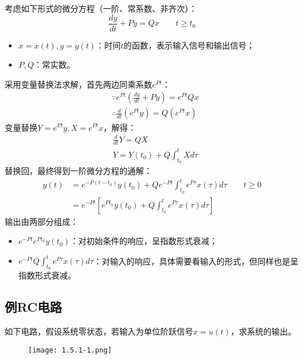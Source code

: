 考虑如下形式的微分方程（一阶、常系数、非齐次）：
\[
\frac{dy}{dt}+Py=Qx \qquad t\geqslant t_0
\]
\begin{itemize}
    \item $x=x\left( t \right) ,y=y\left( t \right) $：时间$t$的函数，表示输入信号和输出信号；
    \item $P,Q$：常实数。
\end{itemize}

采用变量替换法求解，首先两边同乘系数$e^{Pt}$：
\begin{align*}
&\because e^{Pt}\left( \frac{dy}{dt}+Py \right) =e^{Pt}Qx \\
&\therefore \frac{d}{dt}\left( e^{Pt}y \right) =Q\left( e^{Pt}x \right)
\end{align*}
变量替换$Y=e^{Pt}y,X=e^{Pt}x$，解得：
\begin{align*}
&\frac{d}{dt}Y=QX \\
&Y=Y\left( t_0 \right) +Q\int_{t_0}^t{Xd\tau}
\end{align*}
替换回，最终得到一阶微分方程的通解：
\begin{align*}
y\left( t \right) &=e^{-P\left( t-t_0 \right)}y\left( t_0 \right) +Qe^{-Pt}\int_{t_0}^t{e^{P\tau}x\left( \tau \right) d\tau} \qquad t\geqslant 0 \\
&=e^{-Pt}\left[ e^{Pt_0}y\left( t_0 \right) +Q\int_{t_0}^t{e^{P\tau}x\left( \tau \right) d\tau} \right]
\end{align*}
输出由两部分组成：
\begin{itemize}
    \item $e^{-Pt}e^{Pt_0}y\left( t_0 \right) $：对初始条件的响应，呈指数形式衰减；
    \item $e^{-Pt}Q\int_{t_0}^t{e^{P\tau}x\left( \tau \right) d\tau}$：对输入的响应，具体需要看输入的形式，但同样也是呈指数形式衰减。
\end{itemize}

\subsection{例RC电路}

\begin{example}
如下电路，假设系统零状态，若输入为单位阶跃信号$x=u\left( t \right) $，求系统的输出。
\end{example}

\begin{figure}[h]
\centering
\texttt{[image: 1.5.1-1.png]}
\end{figure}

